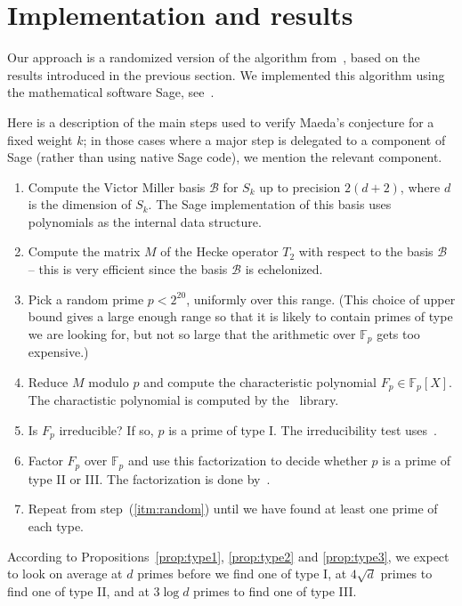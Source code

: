 \documentclass[11pt]{article}
\theoremstyle{plain}
\theoremstyle{definition}
\theoremstyle{remark}
\numberwithin{equation}{section}
\newcommand{\FF}{\mathbb{F}}
\newcommand{\cB}{\mathcal{B}}
\begin{document}
\section{Implementation and results}
\label{sect:implementation}
Our approach is a randomized version of the algorithm
from~\cite{ConreyFarmer}, based on the results introduced in the previous
section.  We implemented this algorithm using the mathematical software Sage, 
see~\cite{Sage}.

Here is a description of the main steps used to verify Maeda's conjecture for
a fixed weight $k$; in those cases where a major step is delegated to a
component of Sage (rather than using native Sage code), we mention the
relevant component.
\begin{enumerate}
  \item\label{itm:vmbasis} Compute the Victor Miller basis $\cB$ for $S_k$ up 
    to precision
    $2(d+2)$, where $d$ is the dimension of $S_k$.  The Sage implementation of
    this basis uses~\cite{FLINT} polynomials as the internal data structure.
  \item\label{itm:hecke} Compute the matrix $M$ of the Hecke operator $T_2$ 
    with respect to the
    basis $\cB$ -- this is very efficient since the basis $\cB$ is
    echelonized.
  \item\label{itm:random} Pick a random prime $p<2^{20}$, uniformly over this
    range.  (This choice of upper
    bound gives a large enough range so that it is likely to contain primes of
    type we are looking for, but not so large that the arithmetic over $\FF_p$
    gets too expensive.)
  \item Reduce $M$ modulo $p$ and compute the characteristic polynomial
    $F_p\in \FF_p[X]$.  The charactistic polynomial is computed by
    the~\cite{Linbox} library.
  \item Is $F_p$ irreducible?  If so, $p$ is a prime of type I.  The
    irreducibility test uses~\cite{FLINT}.
  \item Factor $F_p$ over $\FF_p$ and use this factorization to decide whether
    $p$ is a prime of type II or III.  The factorization is done
    by~\cite{FLINT}.
  \item Repeat from step~(\ref{itm:random}) until we have found at
    least one prime of each type.
\end{enumerate}

According to Propositions~\ref{prop:type1}, \ref{prop:type2} and
\ref{prop:type3}, we expect to look on average at $d$ primes before we find
one of type I, at $4\sqrt{d}$ primes to find one of type II, and at $3\log d$
primes to find one of type III.
\end{document}
